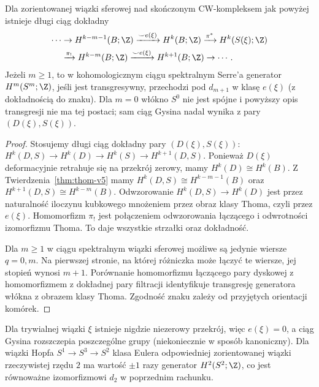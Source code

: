 \begin{twierdzenie}
\label{thm:gysin-v5}
Dla zorientowanej wiązki sferowej nad skończonym CW-kompleksem
jak powyżej istnieje
długi ciąg dokładny
\[
\begin{aligned}
\cdots &\to H^{k-m-1}(B;\Z)
\xrightarrow{\smile e(\xi)}H^k(B;\Z)
\xrightarrow{\pi^*}H^k(S(\xi);\Z)\\
&\xrightarrow{\pi_!}H^{k-m}(B;\Z)
\xrightarrow{\smile e(\xi)}H^{k+1}(B;\Z)\to\cdots.
\end{aligned}
\]
Jeżeli $m\ge1$, to w kohomologicznym ciągu spektralnym
Serre'a generator $H^m(S^m;\Z)$, jeśli jest transgresywny,
przechodzi pod $d_{m+1}$ w klasę $e(\xi)$
(z dokładnością do znaku). Dla $m=0$ włókno $S^0$
nie jest spójne i powyższy opis transgresji nie ma
tej postaci; sam ciąg Gysina nadal wynika z pary
$(D(\xi),S(\xi))$.
\end{twierdzenie}
\begin{proof}
Stosujemy długi ciąg dokładny pary
$(D(\xi),S(\xi))$:
$H^k(D,S)\to H^k(D)\to H^k(S)\to H^{k+1}(D,S)$.
Ponieważ $D(\xi)$ deformacyjnie retrahuje się na przekrój
zerowy, mamy $H^k(D)\cong H^k(B)$.
Z Twierdzenia~\ref{thm:thom-v5} mamy
$H^k(D,S)\cong H^{k-m-1}(B)$ oraz
$H^{k+1}(D,S)\cong H^{k-m}(B)$.
Odwzorowanie $H^k(D,S)\to H^k(D)$ jest przez naturalność
iloczynu kubkowego mnożeniem przez obraz klasy Thoma,
czyli przez $e(\xi)$. Homomorfizm $\pi_!$ jest
połączeniem odwzorowania łączącego i odwrotności izomorfizmu Thoma.
To daje wszystkie strzałki oraz dokładność.

Dla $m\ge1$ w ciągu spektralnym wiązki sferowej możliwe
są jedynie wiersze $q=0,m$. Na pierwszej stronie, na której
różniczka może łączyć te wiersze, jej stopień wynosi $m+1$.
Porównanie homomorfizmu łączącego pary dyskowej
z homomorfizmem z dokładnej pary filtracji identyfikuje
transgresję generatora włókna z obrazem klasy Thoma.
Zgodność znaku zależy od przyjętych orientacji komórek.
\end{proof}
\begin{przyklad}
Dla trywialnej wiązki $\xi$ istnieje nigdzie niezerowy
przekrój, więc $e(\xi)=0$, a ciąg Gysina rozszczepia
poszczególne grupy (niekoniecznie w sposób kanoniczny).
Dla wiązki Hopfa $S^1\to S^3\to S^2$ klasa Eulera
odpowiedniej zorientowanej wiązki rzeczywistej rzędu $2$
ma wartość $\pm1$ razy generator $H^2(S^2;\Z)$,
co jest równoważne izomorfizmowi $d_2$ w poprzednim rachunku.
\end{przyklad}

